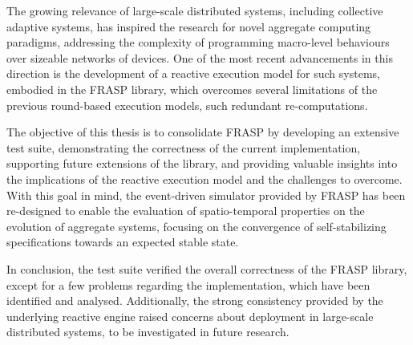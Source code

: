 
The growing relevance of large-scale distributed systems, including collective
adaptive systems, has inspired the research for novel aggregate computing
paradigms, addressing the complexity of programming macro-level behaviours over
sizeable networks of devices. One of the most recent advancements in this
direction is the development of a reactive execution model for such systems,
embodied in the FRASP library, which overcomes several limitations of the
previous round-based execution models, such redundant re-computations.

The objective of this thesis is to consolidate FRASP by developing an extensive
test suite, demonstrating the correctness of the current implementation,
supporting future extensions of the library, and providing valuable insights
into the implications of the reactive execution model and the challenges to
overcome. With this goal in mind, the event-driven simulator provided by FRASP
has been re-designed to enable the evaluation of spatio-temporal properties on
the evolution of aggregate systems, focusing on the convergence of
self-stabilizing specifications towards an expected stable state.

In conclusion, the test suite verified the overall correctness of the FRASP
library, except for a few problems regarding the implementation, which have
been identified and analysed. Additionally, the strong consistency provided by
the underlying reactive engine raised concerns about deployment in large-scale
distributed systems, to be investigated in future research.
